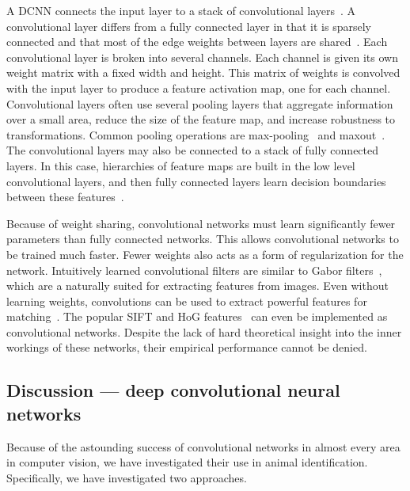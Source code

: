     A DCNN connects the input layer to a stack of convolutional layers~\cite{krizhevsky_imagenet_2012}. A
    convolutional layer differs from a fully connected layer in that it is sparsely connected and that most of the
    edge weights between layers are shared~\cite{lecun_gradient_based_1998, fukushima_neocognitron_1988,
    serre_robust_2007}. Each convolutional layer is broken into several channels. Each channel is given its own
    weight matrix with a fixed width and height. This matrix of weights is convolved with the input layer to
    produce a feature activation map, one for each channel. Convolutional layers often use several pooling layers
    that aggregate information over a small area, reduce the size of the feature map, and increase robustness to
    transformations. Common pooling operations are max-pooling~\cite{serre_robust_2007, krizhevsky_imagenet_2012}
    and maxout~\cite{goodfellow_maxout_2013}. The convolutional layers may also be connected to a stack of fully
    connected layers. In this case, hierarchies of feature maps are built in the low level convolutional layers,
    and then fully connected layers learn decision boundaries between these
    features~\cite{zeiler_visualizing_2014}.

    Because of weight sharing, convolutional networks must learn significantly fewer parameters than fully
      connected networks.
    This allows convolutional networks to be trained much faster.
    Fewer weights also acts as a form of regularization for the network.
    Intuitively learned convolutional filters are similar to Gabor filters~\cite{gabor_theory_1946}, which are a
      naturally suited for extracting features from images.
    Even without learning weights, convolutions can be used to extract powerful features for
      matching~\cite{revaud_deep_2015}.
    The popular SIFT and HoG features~\cite{mahendran_understanding_2014} can even be implemented as
      convolutional networks.
    Despite the lack of hard theoretical insight into the inner workings of these networks, their empirical
      performance cannot be denied.

  \subsection{Discussion --- deep convolutional neural networks}\label{subsec:dcnndiscuss}
        Because of the astounding success of convolutional networks in almost every area in computer vision, we have
        investigated their use in animal identification. Specifically, we have investigated two approaches.

